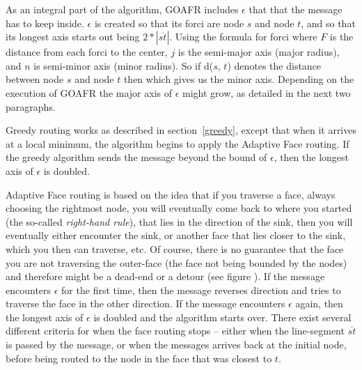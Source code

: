As an integral part of the algorithm, GOAFR includes $\epsilon$ that that the message has to keep inside. $\epsilon$ is created so that its forci are node $s$ and node $t$, and so that its longest axis starts out being $2 * |\overline{st}|$. Using the formula for forci
where $F$ is the distance from each forci to the center, $j$ is the semi-major axis (major radius), and $n$ is semi-minor axis (minor radius). So if d($s$, $t$) denotes the distance between node $s$ and node $t$ then
which gives us the minor axis. Depending on the execution of GOAFR the major axis of $\epsilon$ might grow, as detailed in the next two paragraphs.

Greedy routing works as described in section~\ref{greedy}, except that when it arrives at a local minimum, the algorithm begins to apply the Adaptive Face routing. If the greedy algorithm sends the message beyond the bound of $\epsilon$, then the longest axis of $\epsilon$ is doubled.

Adaptive Face routing is based on the idea that if you traverse a face, always choosing the rightmost node, you will eventually come back to where you started (the so-called \emph{right-hand rule}), that lies in the direction of the sink, then you will eventually either encounter the sink, or another face that lies closer to the sink, which you then can traverse, etc. Of course, there is no guarantee that the face you are not traversing the outer-face (the face not being bounded by the nodes) and therefore might be a dead-end or a detour (see figure ). If the message encounters $\epsilon$ for the first time, then the message reverses direction and tries to traverse the face in the other direction. If the message encounters $\epsilon$ again, then the longest axis of $\epsilon$ is doubled and the algorithm starts over. There exist several different criteria for when the face routing stops -- either when the line-segment $\overline{st}$ is passed by the message, or when the messages arrives back at the initial node, before being routed to the node in the face that was closest to $t$.

